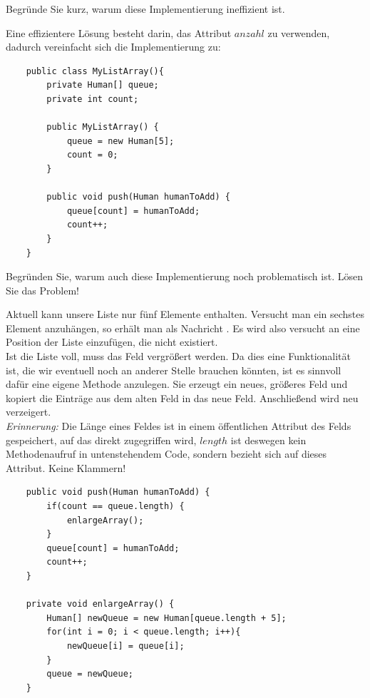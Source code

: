 \documentclass{article}
\begin{document}
\begin{task}{1}
Begründe Sie kurz, warum diese Implementierung ineffizient ist. 
\end{task}
\vspace{2cm}
Eine effizientere Lösung besteht darin, das Attribut $anzahl$ zu verwenden, dadurch vereinfacht sich die Implementierung zu: 

\begin{verbatim}
    public class MyListArray(){
        private Human[] queue;
        private int count; 

        public MyListArray() {
            queue = new Human[5];
            count = 0;
        }

        public void push(Human humanToAdd) {
            queue[count] = humanToAdd;
            count++;
        }
    }
\end{verbatim}

\begin{task}{2}
Begründen Sie, warum auch diese Implementierung noch problematisch ist. Lösen Sie das Problem!
\end{task}

\vspace{2cm}

Aktuell kann unsere Liste nur fünf Elemente enthalten. Versucht man ein sechstes Element anzuhängen, so erhält man
als Nachricht \textbf{}. Es wird also versucht an eine Position der Liste einzufügen, die nicht existiert.\\
Ist die Liste voll, muss das Feld vergrößert werden. Da dies eine Funktionalität ist, die wir eventuell noch an anderer Stelle brauchen könnten, ist es sinnvoll dafür eine eigene Methode anzulegen. Sie erzeugt ein neues, größeres Feld und kopiert die Einträge aus dem alten Feld in das neue Feld. Anschließend wird neu verzeigert.\\
\textit{Erinnerung:} Die Länge eines Feldes ist in einem öffentlichen Attribut des Felds gespeichert, auf das direkt zugegriffen wird, $length$ ist deswegen kein Methodenaufruf in untenstehendem Code, sondern bezieht sich auf dieses Attribut. Keine Klammern!
\begin{verbatim}
    public void push(Human humanToAdd) {
        if(count == queue.length) {
            enlargeArray();
        } 
        queue[count] = humanToAdd;
        count++;
    }

    private void enlargeArray() {
        Human[] newQueue = new Human[queue.length + 5];
        for(int i = 0; i < queue.length; i++){
            newQueue[i] = queue[i];
        }
        queue = newQueue;
    }
\end{verbatim}
\end{document}
